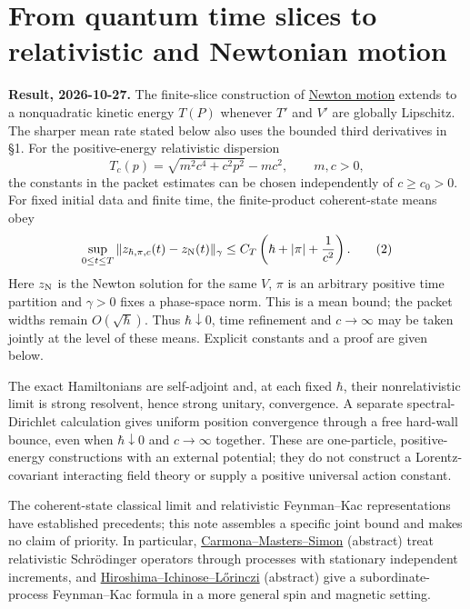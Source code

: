\documentclass[11pt,a4paper]{article}
\begin{document}
\hypertarget{from-quantum-time-slices-to-relativistic-and-newtonian-motion}{%
\section{From quantum time slices to relativistic and Newtonian
motion}\label{from-quantum-time-slices-to-relativistic-and-newtonian-motion}}

\textbf{Result, 2026-10-27.} The finite-slice construction of
\href{quantum-blocks-construct-newton.md}{Newton motion} extends to a
nonquadratic kinetic energy \(T(P)\) whenever \(T'\) and \(V'\) are
globally Lipschitz. The sharper mean rate stated below also uses the
bounded third derivatives in §1. For the positive-energy relativistic
dispersion \[T_c(p)=\sqrt{m^2c^4+c^2p^2}-mc^2,\qquad m,c>0,\tag{1}\] the
constants in the packet estimates can be chosen independently of
\(c\ge c_0>0\). For fixed initial data and finite time, the
finite-product coherent-state means obey \[
 \sup_{0\le t\le T}\|z_{\hbar,\pi,c}(t)-z_{\rm N}(t)\|_\gamma
 \le C_T\left(\hbar+|\pi|+\frac1{c^2}\right).\tag{2}
\] Here \(z_{\rm N}\) is the Newton solution for the same \(V\), \(\pi\)
is an arbitrary positive time partition and \(\gamma>0\) fixes a
phase-space norm. This is a mean bound; the packet widths remain
\(O(\sqrt\hbar)\). Thus \(\hbar\downarrow0\), time refinement and
\(c\to\infty\) may be taken jointly at the level of these means.
Explicit constants and a proof are given below.

The exact Hamiltonians are self-adjoint and, at each fixed \(\hbar\),
their nonrelativistic limit is strong resolvent, hence strong unitary,
convergence. A separate spectral-Dirichlet calculation gives uniform
position convergence through a free hard-wall bounce, even when
\(\hbar\downarrow0\) and \(c\to\infty\) together. These are
one-particle, positive-energy constructions with an external potential;
they do not construct a Lorentz-covariant interacting field theory or
supply a positive universal action constant.

The coherent-state classical limit and relativistic Feynman--Kac
representations have established precedents; this note assembles a
specific joint bound and makes no claim of priority. In particular,
\href{https://doi.org/10.1016/0022-1236(90)90049-Q}{Carmona--Masters--Simon}
(abstract) treat relativistic Schrödinger operators through processes
with stationary independent increments, and
\href{https://arxiv.org/abs/1109.5829}{Hiroshima--Ichinose--Lőrinczi}
(abstract) give a subordinate-process Feynman--Kac formula in a more
general spin and magnetic setting.
\end{document}
